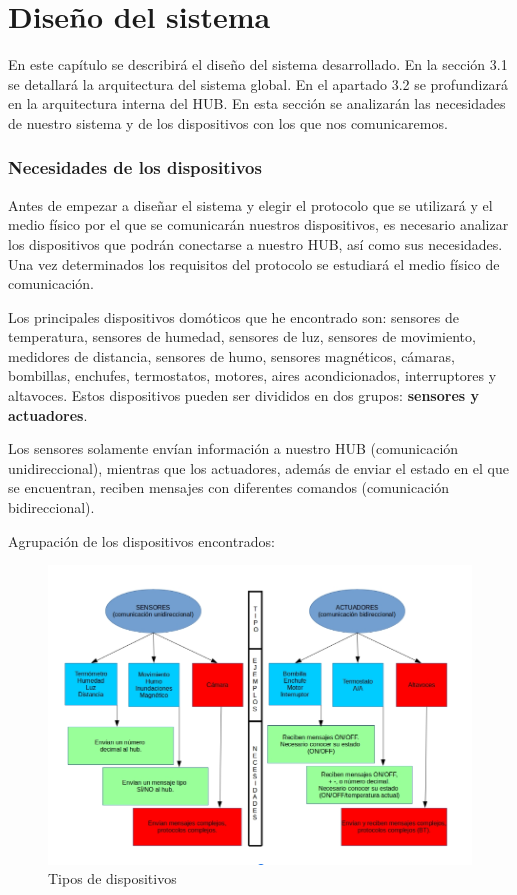 \chapter{Diseño del sistema}
\label{chap:disenosistema}
En este capítulo se describirá el diseño del sistema desarrollado. 
En la sección 3.1 se detallará la arquitectura del sistema global. 
En el apartado 3.2 se profundizará en la arquitectura interna del HUB.
En esta sección se analizarán las necesidades de nuestro sistema y de los dispositivos con los que nos comunicaremos.
\subsection{Necesidades de los dispositivos}
Antes de empezar a diseñar el sistema y elegir el protocolo que se utilizará y el medio físico por el que se comunicarán 
nuestros dispositivos, es necesario analizar los dispositivos que podrán conectarse a nuestro HUB, así como sus necesidades. 
Una vez determinados los requisitos del protocolo se estudiará el medio físico de comunicación.
\par
Los principales dispositivos domóticos que he encontrado son: sensores de temperatura, sensores de humedad, 
sensores de luz, sensores de movimiento, medidores de distancia, sensores de humo, sensores magnéticos, cámaras, 
bombillas, enchufes, termostatos, motores, aires acondicionados, interruptores y altavoces. Estos dispositivos
 pueden ser divididos en dos grupos: \textbf{sensores y actuadores}. 
\par
Los sensores solamente envían información a nuestro HUB (comunicación unidireccional), 
mientras que los actuadores, además de enviar el estado en el que se encuentran, reciben mensajes con diferentes comandos (comunicación bidireccional).
\par
Agrupación de los dispositivos encontrados:

\begin{figure}[H]
\centering
\includegraphics[width=6.00in]{images/descripcion_dispositivos.png}
\caption{Tipos de dispositivos}
\label{fig:descripcion_dispositivos}
\end{figure}


